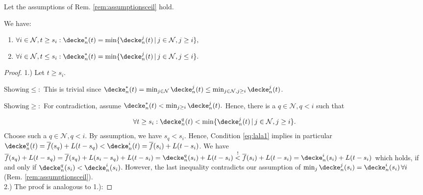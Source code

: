 \begin{lem}\label{lem:shieldingsamples_1d}
Let the assumptions of Rem. \ref{rem:assumptionsceil} hold.

We have:

\begin{enumerate}
\item $\forall i \in \mathcal N, t \geq s_i: \decke_n^* ( t) =\min\{  \decke_n^j (t) \,\vert \, j \in \mathcal N, j \geq i\}, $	
\item $\forall i \in \mathcal N, t \leq s_i: \decke_n^* ( t) =\min\{  \decke_n^j (t) \,\vert \, j \in \mathcal N,j \leq i\}.$ 
\end{enumerate}

\begin{proof}
1.) Let $t \geq s_i$. 

$\text{Showing} \leq:$ This is trivial since $\decke_n^*(t) = \min_{j \in \mathcal N} \decke_n^j(t) \leq \min_{j \in \mathcal N, j \geq i}\decke_n^j(t)$. 


$\text{Showing} \geq:$ For contradiction, assume $\decke_n^* ( t) < \min_{j\geq i} \decke_n^j(t).$ 
Hence, there is a $q \in \mathcal N, q < i$ such that 

\begin{equation}
\label{eq:lala1}
\forall t \geq s_i: \decke_n^q(t) < \min\{  \decke_n^j (t) \,\vert \, j \in \mathcal N, j \geq i\}.
\end{equation}
%
Choose such a $q \in \mathcal N, q < i$.
By assumption, we have $s_q < s_i$. Hence, Condition \ref{eq:lala1} implies in particular $\decke_n^q(t) = \overline f(s_q) + L (t - s_q) < \decke_n^i(t) = \overline f(s_i) + L (t - s_i)$. We have $\overline f(s_q) + L (t - s_q) = \overline f(s_q) + L (s_i - s_q) + L (t - s_i) = \decke_n^q(s_i) + L (t-s_i) \stackrel{!}{ <} \overline f(s_i) + L (t-s_i)=\decke_n^i(s_i) + L (t-s_i) $ which holds, if and only if $\decke_n^q(s_i) < \decke_n^i(s_i)$. However, the last inequality contradicts our assumption of $\min_j \decke_n^j(s_i) =\decke_n^i(s_i)\,\forall i$ (Rem. \ref{rem:assumptionsceil}).\\

2.) The proof is analogous to 1.):


\end{proof}
\end{lem}
